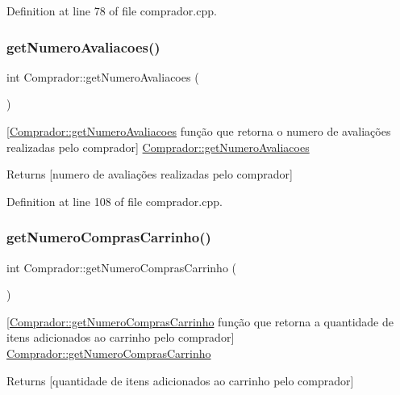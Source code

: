 Definition at line 78 of file comprador.\+cpp.

\mbox{\label{class_comprador_ab17a4464ac51d495b7751fd5ced81005}} 
\subsubsection{\texorpdfstring{get\+Numero\+Avaliacoes()}{getNumeroAvaliacoes()}}
{\footnotesize\ttfamily int Comprador\+::get\+Numero\+Avaliacoes (\begin{DoxyParamCaption}{ }\end{DoxyParamCaption})}

\mbox{[}\hyperlink{class_comprador_ab17a4464ac51d495b7751fd5ced81005}{Comprador\+::get\+Numero\+Avaliacoes} função que retorna o numero de avaliações realizadas pelo comprador\mbox{]}  \hyperlink{class_comprador_ab17a4464ac51d495b7751fd5ced81005}{Comprador\+::get\+Numero\+Avaliacoes} \begin{DoxyReturn}{Returns}
\mbox{[}numero de avaliações realizadas pelo comprador\mbox{]} 
\end{DoxyReturn}


Definition at line 108 of file comprador.\+cpp.

\mbox{\label{class_comprador_a492e697b6237f13d80ff3f6f0b65796e}} 
\subsubsection{\texorpdfstring{get\+Numero\+Compras\+Carrinho()}{getNumeroComprasCarrinho()}}
{\footnotesize\ttfamily int Comprador\+::get\+Numero\+Compras\+Carrinho (\begin{DoxyParamCaption}{ }\end{DoxyParamCaption})}

\mbox{[}\hyperlink{class_comprador_a492e697b6237f13d80ff3f6f0b65796e}{Comprador\+::get\+Numero\+Compras\+Carrinho} função que retorna a quantidade de itens adicionados ao carrinho pelo comprador\mbox{]}  \hyperlink{class_comprador_a492e697b6237f13d80ff3f6f0b65796e}{Comprador\+::get\+Numero\+Compras\+Carrinho} \begin{DoxyReturn}{Returns}
\mbox{[}quantidade de itens adicionados ao carrinho pelo comprador\mbox{]} 
\end{DoxyReturn}



